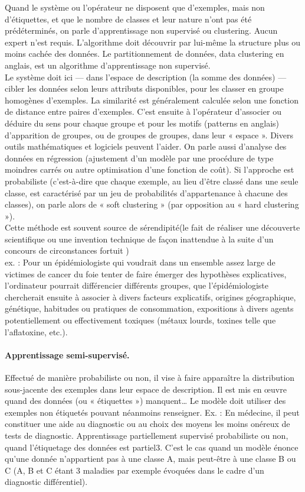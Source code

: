 \documentclass[12pt, french]{article}
\begin{document}
Quand le système ou l'opérateur ne disposent que d'exemples, mais non d'étiquettes, et que le nombre de classes et leur nature n'ont pas été prédéterminés, on parle d'apprentissage non supervisé ou clustering. Aucun expert n'est requis. L'algorithme doit découvrir par lui-même la structure plus ou moins cachée des données. Le partitionnement de données, data clustering en anglais, est un algorithme d'apprentissage non supervisé.\\
Le système doit ici — dans l'espace de description (la somme des données) — cibler les données selon leurs attributs disponibles, pour les classer en groupe homogènes d'exemples. La similarité est généralement calculée selon une fonction de distance entre paires d'exemples. C'est ensuite à l'opérateur d'associer ou déduire du sens pour chaque groupe et pour les motifs (patterns en anglais) d'apparition de groupes, ou de groupes de groupes, dans leur « espace ». Divers outils mathématiques et logiciels peuvent l'aider. On parle aussi d'analyse des données en régression (ajustement d'un modèle par une procédure de type moindres carrés ou autre optimisation d'une fonction de coût). Si l'approche est probabiliste (c'est-à-dire que chaque exemple, au lieu d'être classé dans une seule classe, est caractérisé par un jeu de probabilités d'appartenance à chacune des classes), on parle alors de « soft clustering » (par opposition au « hard clustering »).\\
Cette méthode est souvent source de sérendipité(le fait de réaliser une découverte scientifique ou une invention technique de façon inattendue à la suite d'un concours de circonstances fortuit )\\
ex. : Pour un épidémiologiste qui voudrait dans un ensemble assez large de victimes de cancer du foie tenter de faire émerger des hypothèses explicatives, l'ordinateur pourrait différencier différents groupes, que l'épidémiologiste chercherait ensuite à associer à divers facteurs explicatifs, origines géographique, génétique, habitudes ou pratiques de consommation, expositions à divers agents potentiellement ou effectivement toxiques (métaux lourds, toxines telle que l'aflatoxine, etc.).

\paragraph{Apprentissage semi-supervisé. }
Effectué de manière probabiliste ou non, il vise à faire apparaître la distribution sous-jacente des exemples dans leur espace de description. Il est mis en œuvre quand des données (ou « étiquettes ») manquent… Le modèle doit utiliser des exemples non étiquetés pouvant néanmoins renseigner.
Ex. : En médecine, il peut constituer une aide au diagnostic ou au choix des moyens les moins onéreux de tests de diagnostic.
Apprentissage partiellement supervisé 
probabiliste ou non, quand l'étiquetage des données est partiel3. C'est le cas quand un modèle énonce qu'une donnée n'appartient pas à une classe A, mais peut-être à une classe B ou C (A, B et C étant 3 maladies par exemple évoquées dans le cadre d'un diagnostic différentiel).
\end{document}
